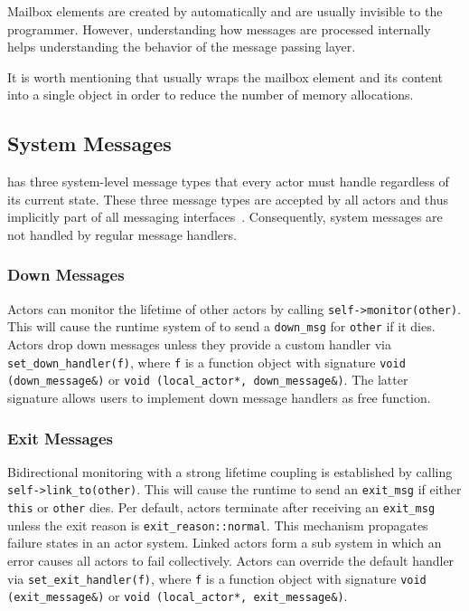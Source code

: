 Mailbox elements are created by \lib automatically and are usually invisible to the programmer. However, understanding how messages are processed internally helps understanding the behavior of the message passing layer.

It is worth mentioning that \lib usually wraps the mailbox element and its content into a single object in order to reduce the number of memory allocations.

\subsection{System Messages}
\label{system-message}

\lib has three system-level message types that every actor must handle regardless of its current state. These three message types are accepted by all actors and thus implicitly part of all messaging interfaces~. Consequently, system messages are not handled by regular message handlers.

\subsubsection{Down Messages}
\label{down-message}

Actors can monitor the lifetime of other actors by calling \lstinline^self->monitor(other)^. This will cause the runtime system of \lib to send a \lstinline^down_msg^ for \lstinline^other^ if it dies. Actors drop down messages unless they provide a custom handler via \lstinline^set_down_handler(f)^, where \lstinline^f^ is a function object with signature \lstinline^void (down_message&)^ or \lstinline^void (local_actor*, down_message&)^. The latter signature allows users to implement down message handlers as free function.

\subsubsection{Exit Messages}
\label{exit-message}

Bidirectional monitoring with a strong lifetime coupling is established by calling \lstinline^self->link_to(other)^. This will cause the runtime to send an \lstinline^exit_msg^ if either \lstinline^this^ or \lstinline^other^ dies. Per default, actors terminate after receiving an \lstinline^exit_msg^ unless the exit reason is \lstinline^exit_reason::normal^. This mechanism propagates failure states in an actor system. Linked actors form a sub system in which an error causes all actors to fail collectively. Actors can override the default handler via \lstinline^set_exit_handler(f)^, where \lstinline^f^ is a function object with signature \lstinline^void (exit_message&)^ or \lstinline^void (local_actor*, exit_message&)^.

